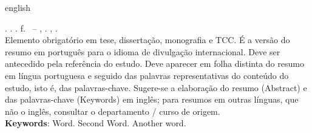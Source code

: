 
\begin{otherlanguage*}{english}
\begin{resumo}[ABSTRACT]
\begin{SingleSpacing}

\imprimirautorcitacao. \imprimirtitleabstract. \imprimirdata. \pageref {LastPage} f. \imprimirprojeto\ – \imprimirprograma, \imprimirinstituicao. \imprimirlocal, \imprimirdata.\\

Elemento obrigatório em tese, dissertação, monografia e TCC. É a versão do resumo em português para o idioma de divulgação internacional. Deve ser antecedido pela referência do estudo. Deve aparecer em folha distinta do resumo em língua portuguesa e seguido das palavras representativas do conteúdo do estudo, isto é, das palavras-chave. Sugere-se a elaboração do resumo (Abstract) e das palavras-chave (Keywords) em inglês; para resumos em outras línguas, que não o inglês, consultar o departamento / curso de origem.\\

\textbf{Keywords}: Word. Second Word. Another word.

\end{SingleSpacing}
\end{resumo}
\end{otherlanguage*}

